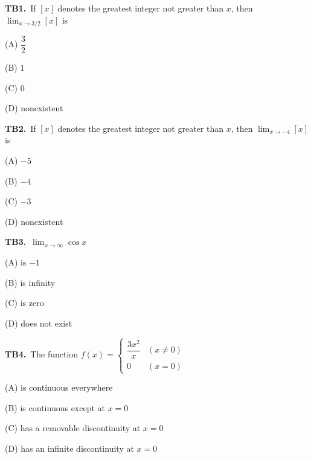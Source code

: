 \documentclass[11pt]{article}
\begin{document}
\bigskip\noindent\textbf{TB1.}\ If $[x]$ denotes the greatest integer not greater than $x$, then $\displaystyle\lim_{x\to 3/2} [x]$ is
\begin{list}{}{\setlength{\leftmargin}{3em}\setlength{\labelwidth}{2.5em}\setlength{\itemsep}{0pt}\setlength{\topsep}{2pt}}
\item[(A)] $\dfrac{3}{2}$
\item[(B)] $1$
\item[(C)] $0$
\item[(D)] nonexistent
\end{list}

\bigskip\noindent\textbf{TB2.}\ If $[x]$ denotes the greatest integer not greater than $x$, then $\displaystyle\lim_{x\to -4} [x]$ is
\begin{list}{}{\setlength{\leftmargin}{3em}\setlength{\labelwidth}{2.5em}\setlength{\itemsep}{0pt}\setlength{\topsep}{2pt}}
\item[(A)] $-5$
\item[(B)] $-4$
\item[(C)] $-3$
\item[(D)] nonexistent
\end{list}

\bigskip\noindent\textbf{TB3.}\ $\displaystyle\lim_{x\to\infty} \cos x$
\begin{list}{}{\setlength{\leftmargin}{3em}\setlength{\labelwidth}{2.5em}\setlength{\itemsep}{0pt}\setlength{\topsep}{2pt}}
\item[(A)] is $-1$
\item[(B)] is infinity
\item[(C)] is zero
\item[(D)] does not exist
\end{list}

\bigskip\noindent\textbf{TB4.}\ The function $f(x) = \begin{cases} \dfrac{3x^2}{x} & (x \neq 0) \\ 0 & (x = 0) \end{cases}$
\begin{list}{}{\setlength{\leftmargin}{3em}\setlength{\labelwidth}{2.5em}\setlength{\itemsep}{0pt}\setlength{\topsep}{2pt}}
\item[(A)] is continuous everywhere
\item[(B)] is continuous except at $x = 0$
\item[(C)] has a removable discontinuity at $x = 0$
\item[(D)] has an infinite discontinuity at $x = 0$
\end{list}
\end{document}
